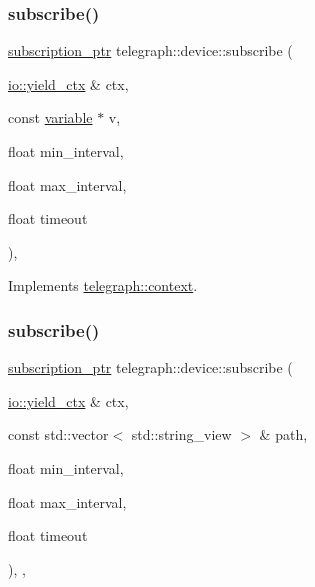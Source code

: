 \subsubsection{\texorpdfstring{subscribe()}{subscribe()}\hspace{0.1cm}{\footnotesize\ttfamily [1/2]}}
{\footnotesize\ttfamily \hyperlink{namespacetelegraph_a58641aa5b1a2cbdb0431916a87069f64}{subscription\+\_\+ptr} telegraph\+::device\+::subscribe (\begin{DoxyParamCaption}\item[{\hyperlink{structboost_1_1asio_1_1yield__ctx}{io\+::yield\+\_\+ctx} \&}]{ctx,  }\item[{const \hyperlink{classtelegraph_1_1variable}{variable} $\ast$}]{v,  }\item[{float}]{min\+\_\+interval,  }\item[{float}]{max\+\_\+interval,  }\item[{float}]{timeout }\end{DoxyParamCaption})\hspace{0.3cm}{\ttfamily [override]}, {\ttfamily [virtual]}}



Implements \hyperlink{classtelegraph_1_1context_aec3b3b0d7210a86f2ea2f5067ef8e922}{telegraph\+::context}.

\mbox{\label{classtelegraph_1_1device_aedf52d2dbb133e2b71958c116671b9df}} 
\subsubsection{\texorpdfstring{subscribe()}{subscribe()}\hspace{0.1cm}{\footnotesize\ttfamily [2/2]}}
{\footnotesize\ttfamily \hyperlink{namespacetelegraph_a58641aa5b1a2cbdb0431916a87069f64}{subscription\+\_\+ptr} telegraph\+::device\+::subscribe (\begin{DoxyParamCaption}\item[{\hyperlink{structboost_1_1asio_1_1yield__ctx}{io\+::yield\+\_\+ctx} \&}]{ctx,  }\item[{const std\+::vector$<$ std\+::string\+\_\+view $>$ \&}]{path,  }\item[{float}]{min\+\_\+interval,  }\item[{float}]{max\+\_\+interval,  }\item[{float}]{timeout }\end{DoxyParamCaption})\hspace{0.3cm}{\ttfamily [inline]}, {\ttfamily [override]}, {\ttfamily [virtual]}}



